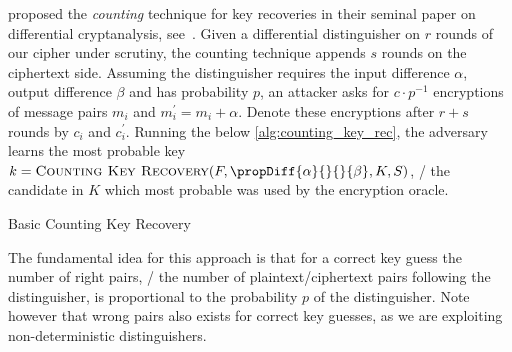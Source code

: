 \citeauthor{C:BihSha90} proposed the \emph{counting} technique for key recoveries in their seminal paper on differential cryptanalysis, see~\cite[End of Section~3]{C:BihSha90}.
Given a differential distinguisher on $r$ rounds of our cipher under scrutiny, the counting technique appends $s$ rounds on the ciphertext side.
Assuming the distinguisher requires the input difference $\alpha$, output difference $\beta$ and has probability $p$, an attacker asks for $c \cdot p^{-1}$ encryptions of message pairs $m_i$ and $m_i^\prime = m_i + \alpha$.
Denote these encryptions after $r+s$ rounds by $c_i$ and $c_i^\prime$.
Running the below \cref{alg:counting_key_rec}, the adversary learns the most probable key $k = \textsc{Counting Key Recovery}(F, \propDiff{\alpha}{}{}{\beta}, K, S)$, \ie/ the candidate in $K$ which most probable was used by the encryption oracle.
\begin{algorithm}
    \caption{Basic Counting Key Recovery}\label{alg:counting_key_rec}
\begin{algorithmic}[1]
    \Statex{}
                \label{line:cnt_key_rec:filter}
                \If{$\beta = \beta^\prime$}
                \EndIf{}
            \EndFor{}
        \EndFor{}
    \State{}
    \EndFunction{}
\end{algorithmic}
\end{algorithm}
The fundamental idea for this approach is that for a correct key guess the number of right pairs, \ie/ the number of plaintext/ciphertext pairs following the distinguisher, is proportional to the probability $p$ of the distinguisher.
Note however that wrong pairs also exists for correct key guesses, as we are exploiting non-deterministic distinguishers.

